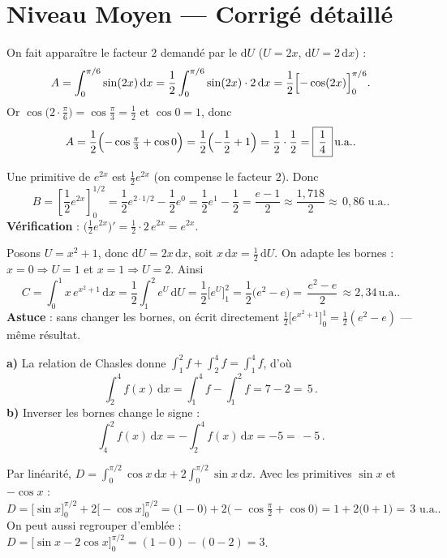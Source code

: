 \documentclass[11pt,a4paper]{article}
\newcommand{\dd}{\mathrm{d}}
\newcommand{\ua}{\,\text{u.a.}}
\begin{document}
\section*{Niveau Moyen — Corrigé détaillé}

\begin{corr}
On fait apparaître le facteur $2$ demandé par le $\dd U$ ($U=2x$, $\dd U=2\,\dd x$) :
\[
A=\int_0^{\pi/6}\sin(2x)\,\dd x=\frac12\int_0^{\pi/6}\sin(2x)\cdot 2\,\dd x
=\frac12\Bigl[-\cos(2x)\Bigr]_0^{\pi/6}.
\]
Or $\cos\bigl(2\cdot\tfrac{\pi}{6}\bigr)=\cos\tfrac{\pi}{3}=\tfrac12$ et $\cos 0=1$, donc
\[
A=\frac12\Bigl(-\cos\tfrac{\pi}{3}+\cos 0\Bigr)=\frac12\Bigl(-\frac12+1\Bigr)=\frac12\cdot\frac12=\boxed{\,\frac14\,}\ua.
\]
\end{corr}

\begin{corr}
Une primitive de $e^{2x}$ est $\tfrac12 e^{2x}$ (on compense le facteur $2$). Donc
\[
B=\left[\frac12 e^{2x}\right]_0^{1/2}=\frac12 e^{2\cdot 1/2}-\frac12 e^{0}=\frac12 e^{1}-\frac12
=\frac{e-1}{2}\approx\frac{1{,}718}{2}\approx\boxed{\,0{,}86\,}\ua.
\]
\textbf{Vérification} : $\bigl(\tfrac12 e^{2x}\bigr)'=\tfrac12\cdot 2\,e^{2x}=e^{2x}$. \checkmark
\end{corr}

\begin{corr}[3 — le $\dd U$ presque présent]
Posons $U=x^2+1$, donc $\dd U=2x\,\dd x$, soit $x\,\dd x=\tfrac12\,\dd U$. On adapte les bornes :
$x=0\Rightarrow U=1$ et $x=1\Rightarrow U=2$. Ainsi
\[
C=\int_0^1 x\,e^{x^2+1}\,\dd x=\frac12\int_1^2 e^{U}\,\dd U=\frac12\bigl[e^{U}\bigr]_1^2
=\frac12\bigl(e^2-e\bigr)=\boxed{\,\frac{e^2-e}{2}\,}\approx 2{,}34\ua.
\]
\textbf{Astuce} : sans changer les bornes, on écrit directement
$\tfrac12\bigl[e^{x^2+1}\bigr]_0^1=\tfrac12(e^2-e)$ — même résultat.
\end{corr}

\begin{corr}
\textbf{a)} La relation de Chasles donne $\displaystyle\int_1^2 f+\int_2^4 f=\int_1^4 f$, d'où
\[
\int_2^4 f(x)\,\dd x=\int_1^4 f-\int_1^2 f=7-2=\boxed{\,5\,}.
\]
\textbf{b)} Inverser les bornes change le signe :
\[
\int_4^2 f(x)\,\dd x=-\int_2^4 f(x)\,\dd x=-5=\boxed{\,-5\,}.
\]
\end{corr}

\begin{corr}
Par linéarité, $D=\displaystyle\int_0^{\pi/2}\cos x\,\dd x+2\int_0^{\pi/2}\sin x\,\dd x$. Avec les
primitives $\sin x$ et $-\cos x$ :
\[
D=\bigl[\sin x\bigr]_0^{\pi/2}+2\bigl[-\cos x\bigr]_0^{\pi/2}
=\bigl(1-0\bigr)+2\bigl(-\cos\tfrac{\pi}{2}+\cos 0\bigr)=1+2\bigl(0+1\bigr)=\boxed{\,3\,}\ua.
\]
On peut aussi regrouper d'emblée : $D=\bigl[\sin x-2\cos x\bigr]_0^{\pi/2}=(1-0)-(0-2)=3$.
\end{corr}
\end{document}
